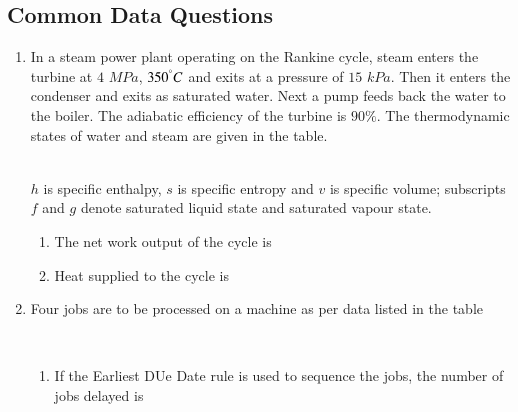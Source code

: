 \documentclass[journal,12pt,onecolumn]{IEEEtran}
\theoremstyle{remark}
\begin{document}
\subsection*{Common Data Questions}
\begin{enumerate}

\item In a steam power plant operating on the Rankine cycle, steam enters the turbine at $4$ $MPa$, $350^\degree C$ and exits at a pressure of $15$ $kPa$. Then it enters the condenser and exits as saturated water. Next a pump feeds back the water to the boiler. The adiabatic efficiency of the turbine is $90\%$. The thermodynamic states of water and steam are given in the table.\\
\begin{table}[h!]    
  \centering
  
\end{table}\\
$h$ is specific enthalpy, $s$ is specific entropy and $v$ is specific volume; subscripts $f$ and $g$ denote saturated liquid state and saturated vapour state.
\begin{enumerate}
\item The net work output  of the cycle is
\hfill{}
\begin{enumerate}[label=(\alph*)]
\end{enumerate}

\item Heat supplied  to the cycle is

\hfill{}
\begin{enumerate}[label=(\alph*)]
\end{enumerate}
\end{enumerate}

\item Four jobs are to be processed on a machine as per data listed in the table
\\\begin{table}[h!]    
  \centering
  
\end{table}\\
\begin{enumerate}
\item If the Earliest DUe Date  rule is used to sequence the jobs, the number of jobs delayed is


\end{enumerate}
\end{enumerate}
\end{document}
